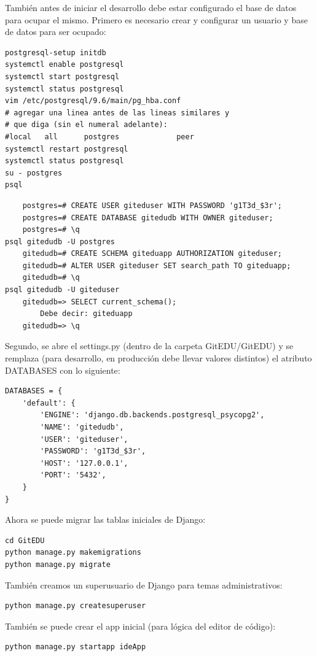 También antes de iniciar el desarrollo debe estar configurado el base de datos para ocupar el mismo. Primero es necesario crear y configurar un usuario y base de datos para ser ocupado:
\begin{lstlisting}
postgresql-setup initdb
systemctl enable postgresql
systemctl start postgresql
systemctl status postgresql
vim /etc/postgresql/9.6/main/pg_hba.conf
# agregar una linea antes de las lineas similares y
# que diga (sin el numeral adelante):
#local   all      postgres             peer
systemctl restart postgresql
systemctl status postgresql
su - postgres
psql
\end{lstlisting}
\begin{lstlisting}
	postgres=# CREATE USER giteduser WITH PASSWORD 'g1T3d_$3r';
	postgres=# CREATE DATABASE gitedudb WITH OWNER giteduser;
	postgres=# \q
psql gitedudb -U postgres
	gitedudb=# CREATE SCHEMA giteduapp AUTHORIZATION giteduser;
	gitedudb=# ALTER USER giteduser SET search_path TO giteduapp;
	gitedudb=# \q
psql gitedudb -U giteduser
	gitedudb=> SELECT current_schema();
		Debe decir: giteduapp
	gitedudb=> \q
\end{lstlisting}

Segundo, se abre el settings.py (dentro de la carpeta GitEDU/GitEDU) y se remplaza (para desarrollo, en producción debe llevar valores distintos) el atributo DATABASES con lo siguiente:
\lstset{language=Python}
\begin{lstlisting}
DATABASES = {
    'default': {
        'ENGINE': 'django.db.backends.postgresql_psycopg2',
        'NAME': 'gitedudb',
        'USER': 'giteduser',
        'PASSWORD': 'g1T3d_$3r',
        'HOST': '127.0.0.1',
        'PORT': '5432',
    }
}
\end{lstlisting}
\lstset{language=Bash}

Ahora se puede migrar las tablas iniciales de Django:
\begin{lstlisting}
cd GitEDU
python manage.py makemigrations
python manage.py migrate
\end{lstlisting}

También creamos un superusuario de Django para temas administrativos:
\begin{lstlisting}
python manage.py createsuperuser
\end{lstlisting}

También se puede crear el app inicial (para lógica del editor de código):
\begin{lstlisting}
python manage.py startapp ideApp
\end{lstlisting}

